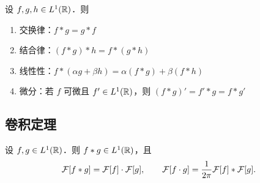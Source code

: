 \documentclass[12pt, a4paper, oneside, UTF8]{ctexbook}
\begin{document}
\begin{theorem}[卷积的基本性质]
设 $f,g,h\in L^1(\mathbb{R})$．则
\begin{enumerate}
    \item 交换律：$f*g = g*f$
    \item 结合律：$(f*g)*h = f*(g*h)$
    \item 线性性：$f*(\alpha g + \beta h) = \alpha(f*g) + \beta(f*h)$
    \item 微分：若 $f$ 可微且 $f'\in L^1(\mathbb{R})$，则 $(f*g)' = f'*g = f*g'$
\end{enumerate}
\end{theorem}

\subsection{卷积定理}

\begin{theorem}
设 $f,g\in L^1(\mathbb{R})$．则 $f*g\in L^1(\mathbb{R})$，且
\[
\mathcal{F}[f*g] = \mathcal{F}[f]\cdot \mathcal{F}[g],\qquad
\mathcal{F}[f\cdot g] = \frac{1}{2\pi}\mathcal{F}[f]*\mathcal{F}[g].
\]
\end{theorem}
\end{document}
